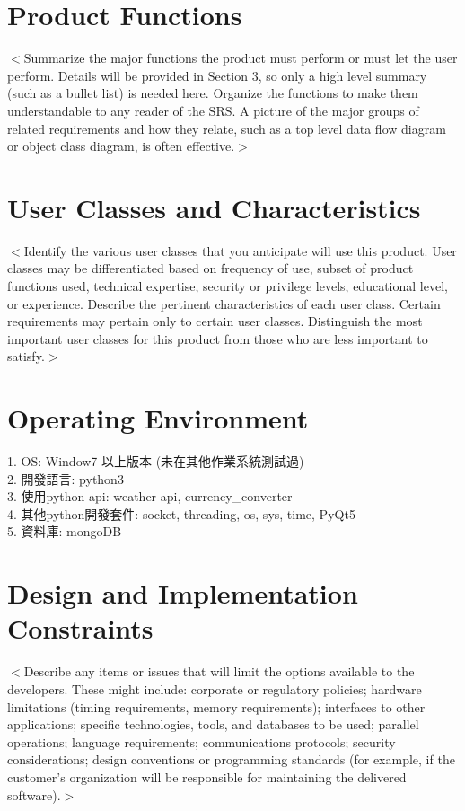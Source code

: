 \documentclass{scrreprt}
\begin{document}
\begin{CJK}{UTF8}{bkai}
\section{Product Functions}
$<$Summarize the major functions the product must perform or must let the user 
perform. Details will be provided in Section 3, so only a high level summary 
(such as a bullet list) is needed here. Organize the functions to make them 
understandable to any reader of the SRS. A picture of the major groups of 
related requirements and how they relate, such as a top level data flow diagram 
or object class diagram, is often effective.$>$

\section{User Classes and Characteristics}
$<$Identify the various user classes that you anticipate will use this product.  
User classes may be differentiated based on frequency of use, subset of product 
functions used, technical expertise, security or privilege levels, educational 
level, or experience. Describe the pertinent characteristics of each user class.  
Certain requirements may pertain only to certain user classes. Distinguish the 
most important user classes for this product from those who are less important 
to satisfy.$>$

\section{Operating Environment}
1. OS: Window7 以上版本 (未在其他作業系統測試過) \\
2. 開發語言: python3 \\
3. 使用python api: weather-api, currency_converter \\
4. 其他python開發套件: socket, threading, os, sys, time, PyQt5 \\
5. 資料庫: mongoDB

\section{Design and Implementation Constraints}
$<$Describe any items or issues that will limit the options available to the 
developers. These might include: corporate or regulatory policies; hardware 
limitations (timing requirements, memory requirements); interfaces to other 
applications; specific technologies, tools, and databases to be used; parallel 
operations; language requirements; communications protocols; security 
considerations; design conventions or programming standards (for example, if the 
customer’s organization will be responsible for maintaining the delivered 
software).$>$


\end{CJK}
\end{document}
